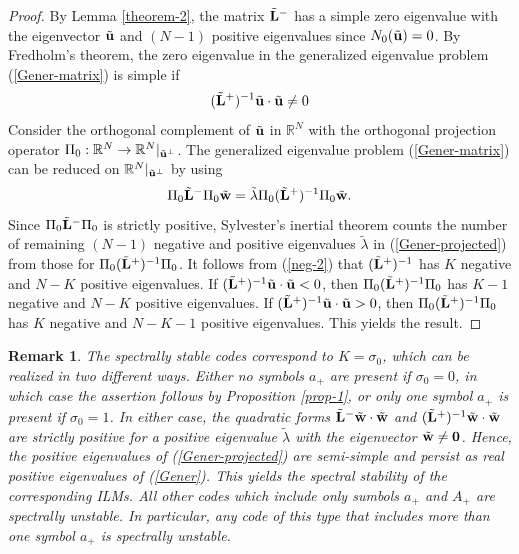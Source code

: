 \documentclass[12pt,reqno]{amsart}
\newtheorem{remark}{Remark}
\begin{document}
\begin{proof}
	By Lemma \ref{theorem-2}, the matrix $\tilde{\bf L}^-$ has a simple zero eigenvalue with the eigenvector $\tilde{\bf u}$ and $(N-1)$ positive eigenvalues since $N_0(\tilde{\bf u}) = 0$. By Fredholm's theorem, the zero eigenvalue in the generalized eigenvalue problem (\ref{Gener-matrix}) is simple if 
	$$
	(\tilde{\bf L}^+)^{-1} \tilde{\bf u} \cdot \tilde{\bf u} \neq 0
	$$
	Consider the orthogonal complement of $\tilde{\bf u}$ in $\mathbb{R}^N$ 
with the orthogonal projection operator $\Pi_0 : \mathbb{R}^N \to \mathbb{R}^N |_{\tilde{\bf u}^{\perp}}$. The generalized eigenvalue problem (\ref{Gener-matrix}) can be reduced on $\mathbb{R}^N |_{\tilde{\bf u}^{\perp}}$ by using 
\begin{equation}
\Pi_0 \tilde{\bf L}^- \Pi_0 \tilde{\bf w} = \tilde{\lambda}  \Pi_0 (\tilde{\bf L}^+)^{-1} \Pi_0 \tilde{\bf w}. 
\label{Gener-projected}
\end{equation}
Since $\Pi_0 \tilde{\bf L}^- \Pi_0$ is strictly positive, Sylvester's inertial theorem counts the number of remaining $(N-1)$ negative and positive eigenvalues $\tilde{\lambda}$ in (\ref{Gener-projected}) from those for $\Pi_0 (\tilde{\bf L}^+)^{-1} \Pi_0 $. It follows from (\ref{neg-2}) that 
$(\tilde{\bf L}^+)^{-1}$ has $K$ negative and $N-K$ positive eigenvalues. 
If $(\tilde{\bf L}^+)^{-1} \tilde{\bf u} \cdot \tilde{\bf u} < 0$, then 
$\Pi_0 (\tilde{\bf L}^+)^{-1} \Pi_0 $ has $K-1$ negative and $N-K$ positive 
eigenvalues. If $(\tilde{\bf L}^+)^{-1} \tilde{\bf u} \cdot \tilde{\bf u} > 0$, then $\Pi_0 (\tilde{\bf L}^+)^{-1} \Pi_0 $ has $K$ negative and $N-K-1$ positive 
eigenvalues. This yields the result. 
\end{proof}

\begin{remark}
	The spectrally stable codes correspond to $K = \sigma_0$, which can be realized in two different ways. Either no symbols $a_+$ are present if $\sigma_0 = 0$, in which case the assertion follows by Proposition \ref{prop-1}, or only one symbol $a_+$ is present if $\sigma_0 = 1$. In either case, the quadratic forms $\tilde{\bf L}^- \tilde{\bf w}  \cdot \tilde{\bf w} $ and  $(\tilde{\bf L}^+)^{-1} \tilde{\bf w}  \cdot \tilde{\bf w} $ are strictly positive for a positive eigenvalue $\tilde{\lambda}$ with the eigenvector $\tilde{\bf w} \neq {\bf 0}$. Hence, the positive eigenvalues of (\ref{Gener-projected}) are semi-simple and persist as real positive eigenvalues of (\ref{Gener}). This yields the spectral stability of the corresponding ILMs. All other codes which include only sumbols $a_+$ and $A_+$ are spectrally unstable.  In particular, any code of this type that includes more than one symbol $a_+$ is spectrally unstable.
\end{remark} 
\end{document}
